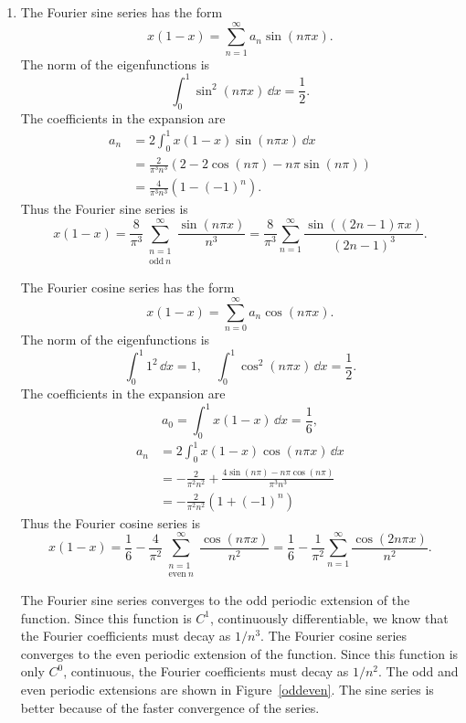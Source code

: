 {%
\begin{Solution}
  \begin{enumerate}
  \item
    The Fourier sine series has the form
    \[
    x (1-x) = \sum_{n = 1}^\infty a_n \sin(n \pi x).
    \]
    The norm of the eigenfunctions is
    \[
    \int_0^1 \sin^2 (n \pi x) \,\dd x = \frac{1}{2}.
    \]
    The coefficients in the expansion are
    \begin{align*}
      a_n     &= 2 \int_0^1 x(1-x) \sin(n \pi x)\,\dd x \\
      &= \frac{2}{\pi^3 n^3} (2 - 2 \cos(n \pi) - n \pi \sin(n \pi) ) \\
      &= \frac{4}{\pi^3 n^3} (1 - (-1)^n).
    \end{align*}
    Thus the Fourier sine series is
    \[
    \boxed{
      x(1-x) = \frac{8}{\pi^3} \sum_{\substack{n = 1 \\ \mathrm{odd}\ n}}^\infty
      \frac{\sin(n \pi x)}{n^3} 
      = \frac{8}{\pi^3} \sum_{n = 1}^\infty \frac{\sin((2n-1) \pi x)}{(2n-1)^3}.
      }
    \]

    The Fourier cosine series has the form
    \[
    x (1-x) = \sum_{n = 0}^\infty a_n \cos(n \pi x).
    \]
    The norm of the eigenfunctions is
    \[
    \int_0^1 1^2 \,\dd x = 1, \quad
    \int_0^1 \cos^2 (n \pi x) \,\dd x = \frac{1}{2}.
    \]
    The coefficients in the expansion are
    \[
    a_0 = \int_0^1 x(1-x) \,\dd x = \frac{1}{6},
    \]
    \begin{align*}
      a_n     &= 2 \int_0^1 x(1-x) \cos(n \pi x)\,\dd x \\
      &= - \frac{2}{\pi^2 n^2} + \frac{4 \sin(n \pi) - n \pi \cos(n \pi)}
      { \pi^3 n^3 } \\
      &= - \frac{2}{\pi^2 n^2} (1 + (-1)^n)
    \end{align*}
    Thus the Fourier cosine series is
    \[
    \boxed{
      x(1-x) = \frac{1}{6} 
      - \frac{4}{\pi^2} \sum_{\substack{n = 1 \\ \mathrm{even}\ n}}^\infty
      \frac{\cos(n \pi x)}{n^2} 
      = \frac{1}{6} - \frac{1}{\pi^2} \sum_{n = 1}^\infty \frac{\cos(2n \pi x)}{n^2}.
      }
    \]

    The Fourier sine series converges to the odd periodic extension of the
    function.  Since this function is $C^1$, continuously differentiable, we
    know that the Fourier coefficients must decay as $1/n^3$.
    The Fourier cosine series converges to the even periodic extension of the
    function.  Since this function is only $C^0$, continuous, 
    the Fourier coefficients must decay as $1/n^2$.  The odd and even periodic
    extensions are shown in Figure~\ref{oddeven}.  The sine series is 
    better because of the faster convergence of the series.


\end{enumerate}
\end{Solution}}
